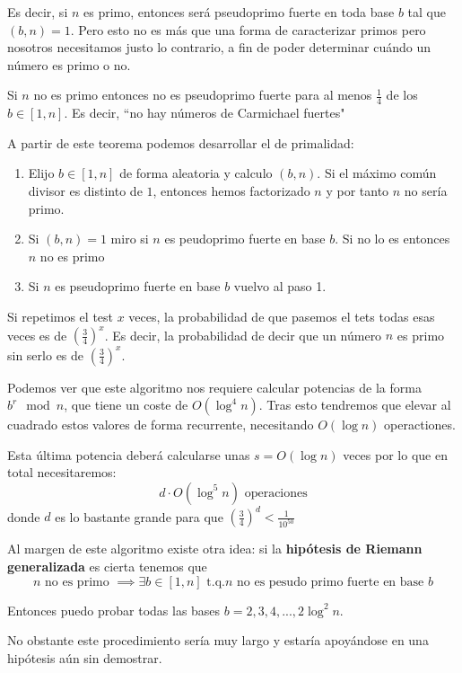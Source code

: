 Es decir, si $n$ es primo, entonces será pseudoprimo fuerte en toda base $b$ tal que $(b,n)=1$.
Pero esto no es más que una forma de caracterizar primos pero nosotros necesitamos justo lo contrario, a fin de poder determinar cuándo un número es primo o no.

\begin{theorem}
Si $n$ no es primo entonces no es pseudoprimo fuerte para al menos $\frac{1}{4}$ de los $b\in [1,n]$. Es decir, ``no hay números de Carmichael fuertes"
\end{theorem}

A partir de este teorema podemos desarrollar el  de primalidad:
\begin{enumerate}
\item Elijo $b\in[1,n]$ de forma aleatoria y calculo $(b,n)$. Si el máximo común divisor es distinto de $1$, entonces hemos factorizado $n$ y por tanto $n$ no sería primo.
\item Si $(b,n)=1$ miro si $n$ es peudoprimo fuerte en base $b$. Si no lo es entonces $n$ no es primo
\item Si $n$ es pseudoprimo fuerte en base $b$ vuelvo al paso 1.
\end{enumerate}

Si repetimos el test $x$ veces, la probabilidad de que pasemos el tets todas esas veces es de $\left(\frac{3}{4}\right)^x$. Es decir, la probabilidad de decir que un número $n$ es primo sin serlo es de $\left(\frac{3}{4}\right)^x$.

Podemos ver que este algoritmo nos requiere calcular potencias de la forma $b^r \mod n$, que tiene un coste de $O(\log^4n)$. Tras esto tendremos que elevar al cuadrado estos valores de forma recurrente, necesitando $O(\log n)$ operactiones. 

Esta última potencia deberá calcularse unas $s=O(\log n)$ veces por lo que en total necesitaremos:
\[d\cdot O(\log^5 n)\text{ operaciones}\]
donde $d$ es lo bastante grande para que $\left(\frac{3}{4}\right)^d < \frac{1}{10^{50}}$

Al margen de este algoritmo existe otra idea: si la \textbf{hipótesis de Riemann generalizada} es cierta tenemos que
\[n \text{ no es primo } \implies \exists b \in [1,n] \text{ t.q.} n \text{ no es pesudo primo fuerte en base } b\]

Entonces puedo probar todas las bases $b=2,3,4,...,2\log^2 n$.

No obstante este procedimiento sería muy largo y estaría apoyándose en una hipótesis aún sin demostrar.

